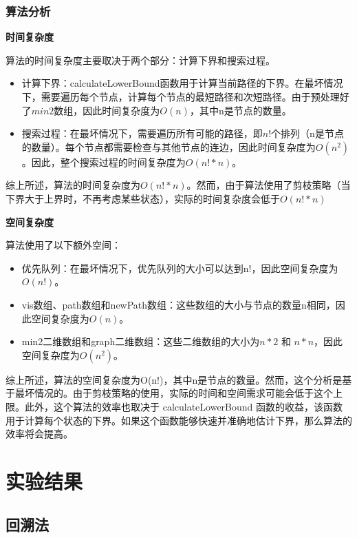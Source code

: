 \documentclass[lang=cn,11pt,a4paper]{elegantpaper}
\begin{document}
\subsubsection{算法分析}

\textbf{时间复杂度} 

算法的时间复杂度主要取决于两个部分：计算下界和搜索过程。

\begin{itemize}
    \item 计算下界：calculateLowerBound函数用于计算当前路径的下界。在最坏情况下，需要遍历每个节点，计算每个节点的最短路径和次短路径。由于预处理好了$min2$数组，因此时间复杂度为$O(n)$，其中n是节点的数量。
    \item 搜索过程：在最坏情况下，需要遍历所有可能的路径，即$n!$个排列（n是节点的数量）。每个节点都需要检查与其他节点的连边，因此时间复杂度为$O(n^2)$。因此，整个搜索过程的时间复杂度为$O(n! * n)$。
\end{itemize}

综上所述，算法的时间复杂度为$O(n! * n)$。然而，由于算法使用了剪枝策略（当下界大于上界时，不再考虑某些状态），实际的时间复杂度会低于$O(n! * n)$

\textbf{空间复杂度} 

算法使用了以下额外空间：

\begin{itemize}
    \item 优先队列：在最坏情况下，优先队列的大小可以达到n!，因此空间复杂度为$O(n!)$。
    \item vis数组、path数组和newPath数组：这些数组的大小与节点的数量n相同，因此空间复杂度为$O(n)$。
    \item min2二维数组和graph二维数组：这些二维数组的大小为$n * 2$ 和 $n * n$，因此空间复杂度为$O(n^2)$。
\end{itemize}

综上所述，算法的空间复杂度为O(n!)，其中n是节点的数量。然而，这个分析是基于最坏情况的。由于剪枝策略的使用，实际的时间和空间需求可能会低于这个上限。此外，这个算法的效率也取决于 calculateLowerBound 函数的收益，该函数用于计算每个状态的下界。如果这个函数能够快速并准确地估计下界，那么算法的效率将会提高。

\section{实验结果}

\subsection{回溯法}
\end{document}
